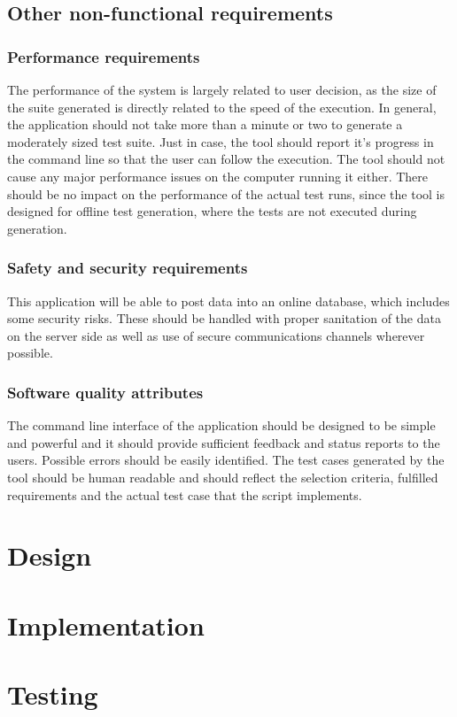 \subsection{Other non-functional requirements}

\subsubsection{Performance requirements}
The performance of the system is largely related to user decision, as the size of the suite generated is directly related to the speed of the execution. In general, the application should not take more than a minute or two to generate a moderately sized test suite. Just in case, the tool should report it's progress in the command line so that the user can follow the execution. The tool should not cause any major performance issues on the computer running it either. There should be no impact on the performance of the actual test runs, since the tool is designed for offline test generation, where the tests are not executed during generation.

\subsubsection{Safety and security requirements}
This application will be able to post data into an online database, which includes some security risks. These should be handled with proper sanitation of the data on the server side as well as use of secure communications channels wherever possible.

\subsubsection{Software quality attributes}
The command line interface of the application should be designed to be simple and powerful and it should provide sufficient feedback and status reports to the users. Possible errors should be easily identified. The test cases generated by the tool should be human readable and should reflect the selection criteria, fulfilled requirements and the actual test case that the script implements.




\section{Design}

\section{Implementation}

\section{Testing}